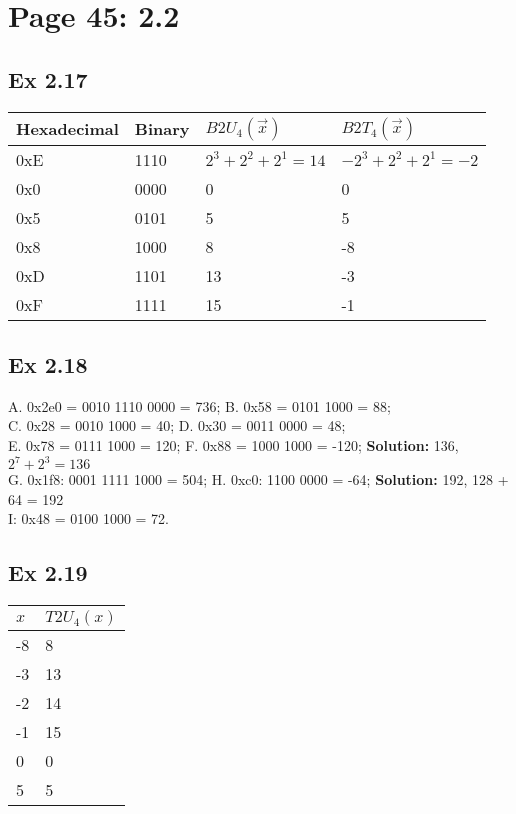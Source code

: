 \section{Page 45: 2.2}
\subsection{Ex 2.17}
\begin{table}[h]
    \centering
    \begin{tabular}{llll}
        \toprule
        Hexadecimal & Binary & $B2U_4(\vec{x})$ & $B2T_4(\vec{x})$\\
        \midrule
        0xE & 1110 & $2^3 + 2^2 + 2^1 = 14$ & $-2^3 + 2^2 + 2^1 = -2$\\
        0x0 & 0000 & 0 & 0 \\
        0x5 & 0101 & 5 & 5\\
        0x8 & 1000 & 8 & -8\\
        0xD & 1101 & 13 & -3\\
        0xF & 1111 & 15 & -1\\
        \bottomrule
    \end{tabular}
\end{table}

\subsection{Ex 2.18}
A. 0x2e0 = 0010 1110 0000 = 736; B. 0x58 = 0101 1000 = 88;\\ 
C. 0x28 = 0010 1000 = 40; D. 0x30 = 0011 0000 = 48;\\
E. 0x78 = 0111 1000 = 120; F. 0x88 = 1000 1000 = -120; {\color{red}\textbf{Solution: }136, $2^7 + 2^3 = 136$}\\
G. 0x1f8: 0001 1111 1000 = 504; H. 0xc0: 1100 0000 = -64; {\color{red}\textbf{Solution: }192, 128 + 64 = 192}\\ 
I: 0x48 = 0100 1000 = 72.

\subsection{Ex 2.19}
\begin{table}[h]
    \centering
    \begin{tabular}{ll}
        \toprule
        $x$ & $T2U_4(x)$\\
        \midrule
        -8 & 8\\
        -3 & 13\\
        -2 & 14\\
        -1 & 15\\
        0 & 0\\
        5 & 5\\
        \bottomrule
    \end{tabular}
\end{table}

